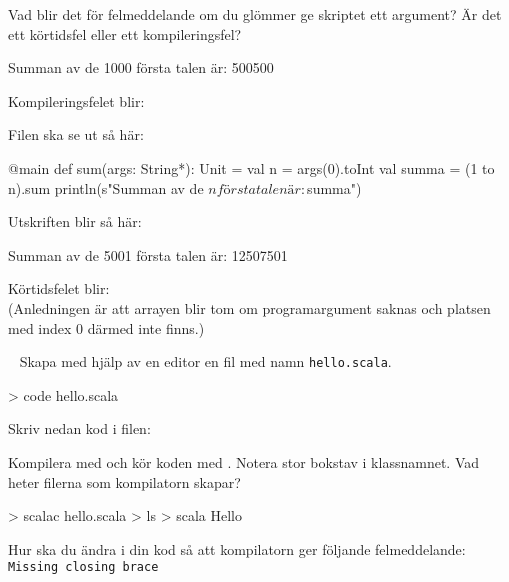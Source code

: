 \Subtask Vad blir det för felmeddelande om du glömmer ge skriptet ett argument? Är det ett körtidsfel eller ett kompileringsfel?

\SOLUTION

\TaskSolved \what

\SubtaskSolved
\begin{REPL}
Summan av de 1000 första talen är: 500500
\end{REPL}

\SubtaskSolved  Kompileringsfelet blir: 

\SubtaskSolved  Filen ska se ut så här:
\begin{Code}
@main
def sum(args: String*): Unit =
  val n = args(0).toInt
  val summa = (1 to n).sum
  println(s"Summan av de $n första talen är: $summa")
\end{Code}

Utskriften blir så här:
\begin{REPL}
Summan av de 5001 första talen är: 12507501
\end{REPL}

\SubtaskSolved Körtidsfelet blir: \\(Anledningen är att arrayen  blir tom om programargument saknas och platsen med index $0$ därmed inte finns.)

\QUESTEND






\QUESTBEGIN

\Task  \what~  Skapa med hjälp av en editor en fil med namn \texttt{hello.scala}.
\begin{REPLnonum}
> code hello.scala
\end{REPLnonum}
Skriv nedan kod i filen:



\Subtask Kompilera med  och kör koden med . Notera stor bokstav i klassnamnet. Vad heter filerna som kompilatorn skapar?
\begin{REPLnonum}
> scalac hello.scala
> ls
> scala Hello
\end{REPLnonum}

\Subtask Hur ska du ändra i din kod så att kompilatorn ger följande felmeddelande: \\
\texttt{Missing closing brace}

